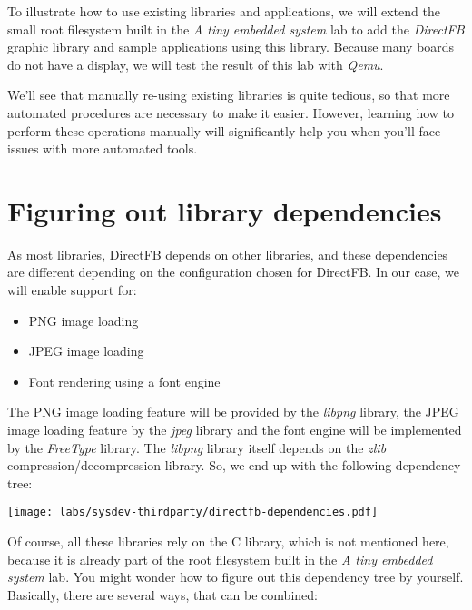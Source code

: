 
To illustrate how to use existing libraries and applications, we will
extend the small root filesystem built in the {\em A tiny embedded
  system} lab to add the {\em DirectFB} graphic library and sample
applications using this library. Because many boards do not have a
display, we will test the result of this lab with {\em Qemu}.

We'll see that manually re-using existing libraries is quite tedious,
so that more automated procedures are necessary to make it
easier. However, learning how to perform these operations manually
will significantly help you when you'll face issues with more
automated tools.

\section{Figuring out library dependencies}

As most libraries, DirectFB depends on other libraries, and these
dependencies are different depending on the configuration chosen for
DirectFB. In our case, we will enable support for:

\begin{itemize}
\item PNG image loading
\item JPEG image loading
\item Font rendering using a font engine
\end{itemize}

The PNG image loading feature will be provided by the {\em libpng}
library, the JPEG image loading feature by the {\em jpeg} library and
the font engine will be implemented by the {\em FreeType} library. The
{\em libpng} library itself depends on the {\em zlib}
compression/decompression library. So, we end up with the following
dependency tree:

\begin{center}
\texttt{[image: labs/sysdev-thirdparty/directfb-dependencies.pdf]}
\end{center}

Of course, all these libraries rely on the C library, which is not
mentioned here, because it is already part of the root filesystem
built in the {\em A tiny embedded system} lab. You might wonder how to
figure out this dependency tree by yourself. Basically, there are
several ways, that can be combined:

